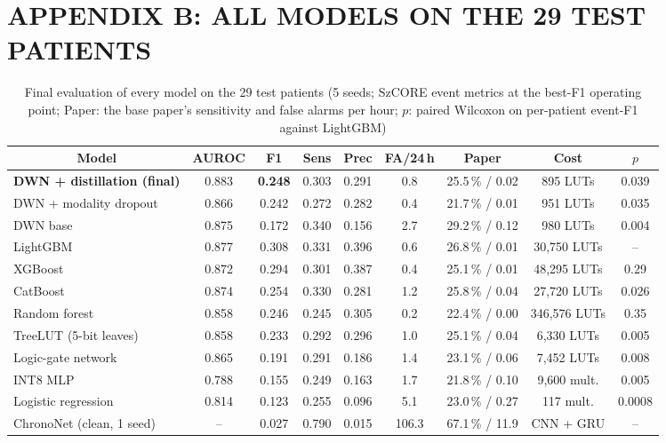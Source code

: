 \cleardoublepage
{}\label{app:results}
\setcounter{table}{0}
\chapter*{APPENDIX B: ALL MODELS ON THE 29 TEST PATIENTS}

\begin{table}[H]
\centering\footnotesize
\caption{Final evaluation of every model on the 29 test patients (5 seeds; SzCORE event metrics at the best-F1
operating point; Paper: the base paper's sensitivity and false alarms per hour; $p$: paired Wilcoxon on per-patient
event-F1 against LightGBM)}\label{tab:test-full}
\setlength{\tabcolsep}{2pt}
\begin{tabular}{|l|c|c|c|c|c|c|c|c|}
\hline
\multicolumn{1}{|c|}{\textbf{Model}} & \textbf{AUROC} & \textbf{F1} & \textbf{Sens} & \textbf{Prec} & \textbf{FA/24\,h} &
\textbf{Paper} & \textbf{Cost} & \textbf{$p$}\\
\hline
\textbf{DWN + distillation (final)} & 0.883 & \textbf{0.248} & 0.303 & 0.291 & 0.8 & 25.5\,\% / 0.02 & 895 LUTs & 0.039\\
\hline
DWN + modality dropout & 0.866 & 0.242 & 0.272 & 0.282 & 0.4 & 21.7\,\% / 0.01 & 951 LUTs & 0.035\\
\hline
DWN base & 0.875 & 0.172 & 0.340 & 0.156 & 2.7 & 29.2\,\% / 0.12 & 980 LUTs & 0.004\\
\hline
LightGBM & 0.877 & 0.308 & 0.331 & 0.396 & 0.6 & 26.8\,\% / 0.01 & 30,750 LUTs & --\\
\hline
XGBoost & 0.872 & 0.294 & 0.301 & 0.387 & 0.4 & 25.1\,\% / 0.01 & 48,295 LUTs & 0.29\\
\hline
CatBoost & 0.874 & 0.254 & 0.330 & 0.281 & 1.2 & 25.8\,\% / 0.04 & 27,720 LUTs & 0.026\\
\hline
Random forest & 0.858 & 0.246 & 0.245 & 0.305 & 0.2 & 22.4\,\% / 0.00 & 346,576 LUTs & 0.35\\
\hline
TreeLUT (5-bit leaves) & 0.858 & 0.233 & 0.292 & 0.296 & 1.0 & 25.1\,\% / 0.04 & 6,330 LUTs & 0.005\\
\hline
Logic-gate network & 0.865 & 0.191 & 0.291 & 0.186 & 1.4 & 23.1\,\% / 0.06 & 7,452 LUTs & 0.008\\
\hline
INT8 MLP & 0.788 & 0.155 & 0.249 & 0.163 & 1.7 & 21.8\,\% / 0.10 & 9,600 mult. & 0.005\\
\hline
Logistic regression & 0.814 & 0.123 & 0.255 & 0.096 & 5.1 & 23.0\,\% / 0.27 & 117 mult. & 0.0008\\
\hline
ChronoNet (clean, 1 seed) & -- & 0.027 & 0.790 & 0.015 & 106.3 & 67.1\,\% / 11.9 & CNN + GRU & --\\
\hline
\end{tabular}
\end{table}
